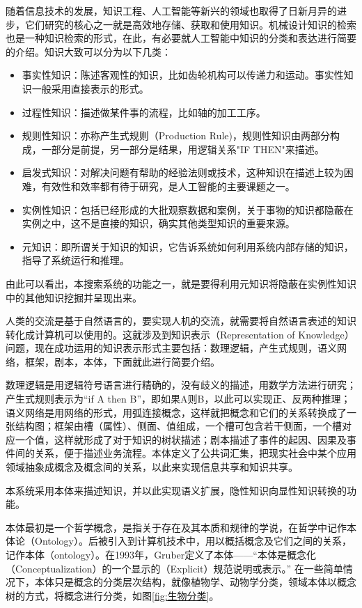 \documentclass[12pt,a4paper]{article}
\begin{document}
	随着信息技术的发展，知识工程、人工智能等新兴的领域也取得了日新月异的进步，它们研究的核心之一就是高效地存储、获取和使用知识。机械设计知识的检索也是一种知识检索的形式，在此，有必要就人工智能中知识的分类和表达进行简要的介绍。知识大致可以分为以下几类：
	\begin{itemize}
		\item
	事实性知识：陈述客观性的知识，比如齿轮机构可以传递力和运动。事实性知识一般采用直接表示的形式。
		\item
	过程性知识：描述做某件事的流程，比如轴的加工工序。
		\item
	规则性知识：亦称产生式规则（{\Times Production Rule})，规则性知识由两部分构成，一部分是前提，另一部分是结果，用逻辑关系"{\Times IF THEN}"来描述。
		\item
	启发式知识：对解决问题有帮助的经验法则或技术，这种知识在描述上较为困难，有效性和效率都有待于研究，是人工智能的主要课题之一。
		\item
	实例性知识：包括已经形成的大批观察数据和案例，关于事物的知识都隐蔽在实例之中，这不是直接的知识，确实其他类型知识的重要来源。
		\item
	元知识：即所谓关于知识的知识，它告诉系统如何利用系统内部存储的知识，指导了系统运行和推理。
	\end{itemize}
	
	由此可以看出，本搜索系统的功能之一，就是要得利用元知识将隐蔽在实例性知识中的其他知识挖掘并呈现出来。
	
	人类的交流是基于自然语言的，要实现人机的交流，就需要将自然语言表述的知识转化成计算机可以使用的。这就涉及到知识表示（{\Times Representation of Knowledge}）问题，现在成功运用的知识表示形式主要包括：数理逻辑，产生式规则，语义网络，框架，剧本，本体，下面就此进行简要介绍。
	
	数理逻辑是用逻辑符号语言进行精确的，没有歧义的描述，用数学方法进行研究；产生式规则表示为“{\Times if A then B}”，即如果{\Times A}则{\Times B}，以此可以实现正、反两种推理；语义网络是用网络的形式，用弧连接概念，这样就把概念和它们的关系转换成了一张结构图；框架由槽（属性）、侧面、值组成，一个槽可包含若干侧面，一个槽对应一个值，这样就形成了对于知识的树状描述；剧本描述了事件的起因、因果及事件间的关系，便于描述业务流程。本体定义了公共词汇集，把现实社会中某个应用领域抽象成概念及概念间的关系，以此来实现信息共享和知识共享。 

	本系统采用本体来描述知识，并以此实现语义扩展，隐性知识向显性知识转换的功能。
	
	本体最初是一个哲学概念，是指关于存在及其本质和规律的学说，在哲学中记作本体论（{\Times Ontology}）。后被引入到计算机技术中，用以概括概念及它们之间的关系，记作本体（{\Times ontology}）。在1993年，{\Times Gruber}定义了本体——“本体是概念化（{\Times Conceptualization}）的一个显示的（{\Times Explicit}）规范说明或表示。”\cite{gruber1993} 在一些简单情况下，本体只是概念的分类层次结构，就像植物学、动物学分类，领域本体以概念树的方式，将概念进行分类，如图\ref{fig:生物分类}。
	
\end{document}
